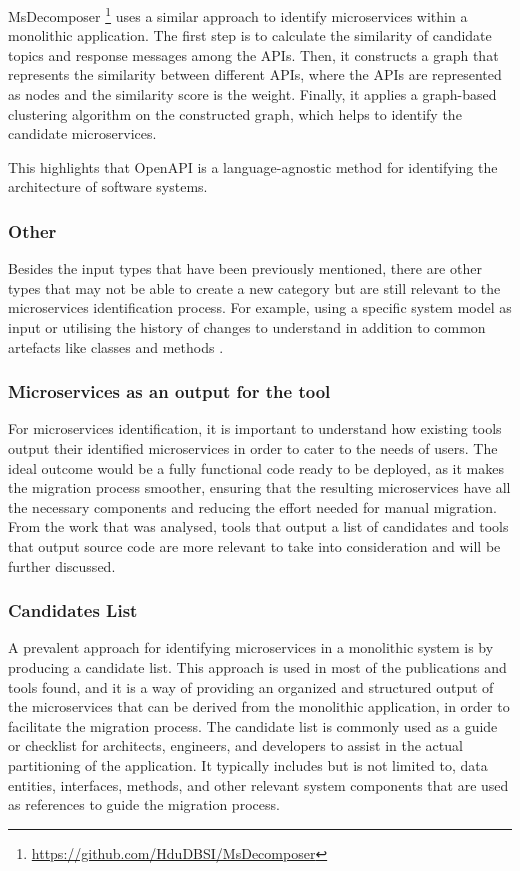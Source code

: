 \documentclass[conference]{IEEEtran}
\begin{document}
MsDecomposer \footnote{\url{https://github.com/HduDBSI/MsDecomposer}}
 uses a similar approach to identify microservices
within a monolithic application. The first step is to calculate the similarity
of candidate topics and response messages among the APIs. Then, it constructs a
graph that represents the similarity between different APIs, where the APIs are
represented as nodes and the similarity score is the weight. Finally, it
applies a graph-based clustering algorithm on the constructed graph, which
helps to identify the candidate microservices.

This highlights that OpenAPI is a language-agnostic method for identifying the
architecture of software systems.

\subsubsection*{Other}

Besides the input types that have been previously mentioned, there are other
types that may not be able to create a new category but are still relevant to
the microservices identification process. For example, using a specific system
model as input  or utilising the history of changes
to understand in addition to common artefacts like classes and methods
.

\subsubsection{Microservices as an output for the tool}

For microservices identification, it is important to understand how existing
tools output their identified microservices in order to cater to the needs of
users. The ideal outcome would be a fully functional code ready to be deployed,
as it makes the migration process smoother, ensuring that the resulting
microservices have all the necessary components and reducing the effort needed
for manual migration. From the work that was analysed, tools that output a list
of candidates and tools that output source code are more relevant to take into
consideration and will be further discussed.

\subsubsection*{Candidates List}

A prevalent approach for identifying microservices in a monolithic system is by
producing a candidate list. This approach is used in most of the publications
and tools found, and it is a way of providing an organized and structured
output of the microservices that can be derived from the monolithic
application, in order to facilitate the migration process. The candidate list
is commonly used as a guide or checklist for architects, engineers, and
developers to assist in the actual partitioning of the application. It
typically includes but is not limited to, data entities, interfaces, methods,
and other relevant system components that are used as references to guide the
migration process.
\end{document}
